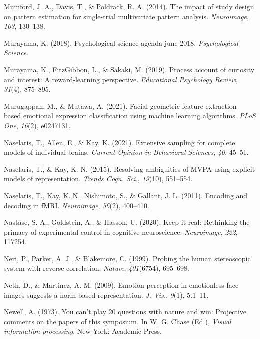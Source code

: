 \documentclass[11pt,american,a4paper,oneside,]{memoir} %
\begin{document}
\leavevmode\hypertarget{ref-mumford2014impact}{}%
Mumford, J. A., Davis, T., \& Poldrack, R. A. (2014). The impact of study design on pattern estimation for single-trial multivariate pattern analysis. \emph{Neuroimage}, \emph{103}, 130--138.

\leavevmode\hypertarget{ref-murayama2018psychological}{}%
Murayama, K. (2018). Psychological science agenda\textbar{} june 2018. \emph{Psychological Science}.

\leavevmode\hypertarget{ref-murayama2019process}{}%
Murayama, K., FitzGibbon, L., \& Sakaki, M. (2019). Process account of curiosity and interest: A reward-learning perspective. \emph{Educational Psychology Review}, \emph{31}(4), 875--895.

\leavevmode\hypertarget{ref-Murugappan2021-yj}{}%
Murugappan, M., \& Mutawa, A. (2021). Facial geometric feature extraction based emotional expression classification using machine learning algorithms. \emph{PLoS One}, \emph{16}(2), e0247131.

\leavevmode\hypertarget{ref-Naselaris2021-ba}{}%
Naselaris, T., Allen, E., \& Kay, K. (2021). Extensive sampling for complete models of individual brains. \emph{Current Opinion in Behavioral Sciences}, \emph{40}, 45--51.

\leavevmode\hypertarget{ref-Naselaris2015-jn}{}%
Naselaris, T., \& Kay, K. N. (2015). Resolving ambiguities of MVPA using explicit models of representation. \emph{Trends Cogn. Sci.}, \emph{19}(10), 551--554.

\leavevmode\hypertarget{ref-Naselaris2011-oh}{}%
Naselaris, T., Kay, K. N., Nishimoto, S., \& Gallant, J. L. (2011). Encoding and decoding in fMRI. \emph{Neuroimage}, \emph{56}(2), 400--410.

\leavevmode\hypertarget{ref-Nastase2020-he}{}%
Nastase, S. A., Goldstein, A., \& Hasson, U. (2020). Keep it real: Rethinking the primacy of experimental control in cognitive neuroscience. \emph{Neuroimage}, \emph{222}, 117254.

\leavevmode\hypertarget{ref-Neri1999-rj}{}%
Neri, P., Parker, A. J., \& Blakemore, C. (1999). Probing the human stereoscopic system with reverse correlation. \emph{Nature}, \emph{401}(6754), 695--698.

\leavevmode\hypertarget{ref-Neth2009-eh}{}%
Neth, D., \& Martinez, A. M. (2009). Emotion perception in emotionless face images suggests a norm-based representation. \emph{J. Vis.}, \emph{9}(1), 5.1--11.

\leavevmode\hypertarget{ref-Newell1973-no}{}%
Newell, A. (1973). You can't play 20 questions with nature and win: Projective comments on the papers of this symposium. In W. G. Chase (Ed.), \emph{Visual information processing}. New York: Academic Press.
\end{document}

